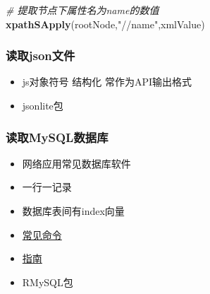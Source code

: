 \documentclass[]{book}
\newenvironment{Shaded}{\begin{snugshade}}{\end{snugshade}}
\newcommand{\CommentTok}[1]{\textcolor[rgb]{0.56,0.35,0.01}{\textit{#1}}}
\newcommand{\DataTypeTok}[1]{\textcolor[rgb]{0.13,0.29,0.53}{#1}}
\newcommand{\KeywordTok}[1]{\textcolor[rgb]{0.13,0.29,0.53}{\textbf{#1}}}
\newcommand{\NormalTok}[1]{#1}
\newcommand{\OperatorTok}[1]{\textcolor[rgb]{0.81,0.36,0.00}{\textbf{#1}}}
\newcommand{\OtherTok}[1]{\textcolor[rgb]{0.56,0.35,0.01}{#1}}
\newcommand{\StringTok}[1]{\textcolor[rgb]{0.31,0.60,0.02}{#1}}
\providecommand{\tightlist}{%
  \setlength{\itemsep}{0pt}\setlength{\parskip}{0pt}}
\begin{document}
\begin{Shaded}
\begin{Highlighting}[]
\CommentTok{# 提取节点下属性名为name的数值}
\KeywordTok{xpathSApply}\NormalTok{(rootNode,}\StringTok{"//name"}\NormalTok{,xmlValue)}
\end{Highlighting}
\end{Shaded}

\hypertarget{ux8bfbux53d6jsonux6587ux4ef6}{%
\subsubsection{读取json文件}\label{ux8bfbux53d6jsonux6587ux4ef6}}

\begin{itemize}
\tightlist
\item
  js对象符号 结构化 常作为API输出格式
\item
  jsonlite包
\end{itemize}

\begin{Shaded}
\end{Shaded}

\hypertarget{ux8bfbux53d6mysqlux6570ux636eux5e93}{%
\subsubsection{读取MySQL数据库}\label{ux8bfbux53d6mysqlux6570ux636eux5e93}}

\begin{itemize}
\tightlist
\item
  网络应用常见数据库软件
\item
  一行一记录
\item
  数据库表间有index向量
\item
  \href{http://www.pantz.org/software/mysql/mysqlcommands.html}{常见命令}
\item
  \href{http://www.r-bloggers.com/mysql-and-r/}{指南}
\item
  RMySQL包
\end{itemize}
\end{document}
